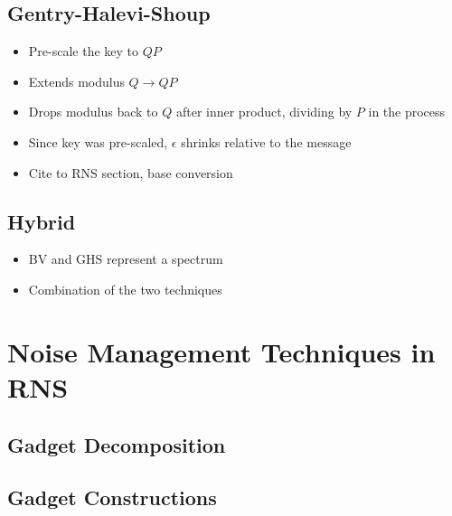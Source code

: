 \subsection{Gentry-Halevi-Shoup}
\begin{itemize}
    \item Pre-scale the key to $QP$ 
    \item Extends modulus $Q\to QP$ \cite{cryptoeprint:2012/099}
    \item Drops modulus back to $Q$ after inner product, dividing by $P$ in the process
    \item Since key was pre-scaled, $\epsilon$ shrinks relative to the message
    \item Cite to RNS section, base conversion
\end{itemize}

\subsection{Hybrid}
\begin{itemize}
    \item BV and GHS represent a spectrum
    \item Combination of the two techniques
\end{itemize}



\newpage
\section{Noise Management Techniques in RNS}

\subsection{Gadget Decomposition}

\subsection{Gadget Constructions}          %

